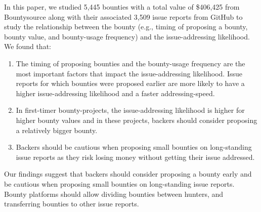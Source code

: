 

In this paper, we studied 5,445 bounties with a total value of \$406,425 from Bountysource along with their associated 3,509 issue reports from GitHub to study the relationship between the bounty (e.g., timing of proposing a bounty, bounty value, and bounty-usage frequency) and the issue-addressing likelihood.
We found that:
\begin{enumerate}
\item The timing of proposing bounties and the bounty-usage frequency are the most important factors that impact the issue-addressing likelihood. Issue reports for which bounties were proposed earlier are more likely to have a higher issue-addressing likelihood and a faster addressing-speed. 
\item In first-timer bounty-projects, the issue-addressing likelihood is higher for higher bounty values and in these projects, backers should consider proposing a relatively bigger bounty. 
\item Backers should be cautious when proposing small bounties on long-standing issue reports as they risk losing money without getting their issue addressed.
\end{enumerate}


Our findings suggest that backers should consider proposing a bounty early and be cautious when proposing small bounties on long-standing issue reports. Bounty platforms should allow dividing bounties between hunters, and transferring bounties to other issue reports.


